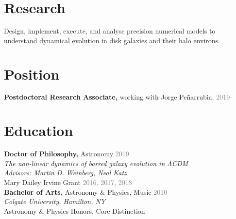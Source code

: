 \documentclass[margin, a4paper,11pt]{res} %
\begin{document}
\begin{resume}

\section{\sc \textcolor{redshade}{Research} }

Design, implement, execute, and analyse precision numerical models to understand dynamical evolution in disk galaxies and their halo environs.


\section{\sc \textcolor{redshade}{Position}}

{\bf Postdoctoral Research Associate,} working with Jorge Pe{\~n}arrubia. \hfill \textcolor{grey}{2019-}

\section{\sc \textcolor{redshade}{Education}}

{\bf Doctor of Philosophy,} Astronomy \hfill \textcolor{grey}{2019}\\
\hspace*{0.25 in} {\sl \textcolor{blueshade}{The non-linear dynamics of barred galaxy evolution in $\Lambda$CDM}}\\
\hspace*{0.25 in} {\sl Advisors: Martin D. Weinberg, Neal Katz}\\
\hspace*{0.4 in} Mary Dailey Irvine Grant \hfill \textcolor{grey}{2016, 2017, 2018}\\
{\bf Bachelor of Arts,} Astronomy \& Physics, Music \hfill \textcolor{grey}{2010}\\
\hspace*{0.25 in} {\sl Colgate University, Hamilton, NY}\\
\hspace*{0.4 in} Astronomy \& Physics Honors, Core Distinction


\end{resume}
\end{document}
